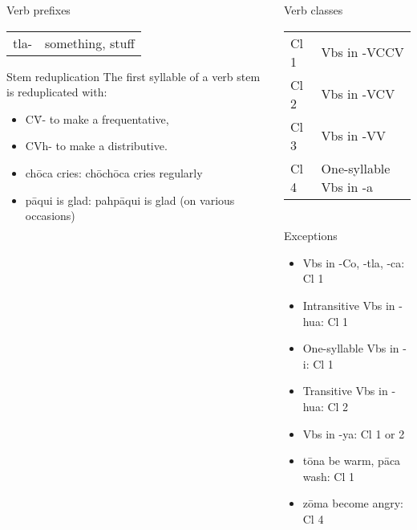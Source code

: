 \documentclass[12pt]{beamer}
\newcommand{\nah}[1]{\textcolor{nahgrn}{#1}}
\newcommand{\trs}[1]{\textcolor{nahblu}{#1}}
\begin{document}
\begin{frame}
\begin{columns}[t]
\begin{column}{0.18\linewidth}
\begin{block}{Verb prefixes}
\begin{tabular}[t]{ll}
          \nah{tla-} & \trs{something, stuff}           \\
        \end{tabular}
      \end{block}
      \begin{block}{Stem reduplication}
        The first syllable of a verb stem is reduplicated with:
        \begin{itemize}
          \item \nah{C\=V-} to make a frequentative,
          \item \nah{CVh-} to make a distributive.
        \end{itemize}
      \end{block}
      \begin{example}
        \begin{itemize}
        \item \nah{chōca} \trs{cries}: \nah{chōchōca} \trs{cries regularly}
        \item \nah{pāqui} \trs{is glad}: \nah{pahpāqui} \trs{is glad (on various occasions)}
        \end{itemize}
      \end{example}
    \end{column}
    \begin{column}{.18\linewidth}
      \begin{block}{Verb classes}
        \begin{tabular}{ll}
          Cl 1 & Vbs in \nah{-VCCV}           \\
          Cl 2 & Vbs in \nah{-VCV}            \\
          Cl 3 & Vbs in \nah{-VV}             \\
          Cl 4 & One-syllable Vbs in \nah{-a}
        \end{tabular}\\
        Exceptions
        \begin{itemize}
          \item Vbs in \nah{-Co}, \nah{-tla}, \nah{-ca}: Cl 1
          \item Intransitive Vbs in \nah{-hua}: Cl 1
          \item One-syllable Vbs in \nah{-i}: Cl 1
          \item Transitive Vbs in \nah{-hua}: Cl 2
          \item Vbs in \nah{-ya}: Cl 1 or 2
          \item \nah{tōna} \trs{be warm}, \nah{pāca} \trs{wash}: Cl 1
          \item \nah{zōma} \trs{become angry}: Cl 4

\end{itemize}
\end{block}
\end{column}
\end{columns}
\end{frame}
\end{document}
